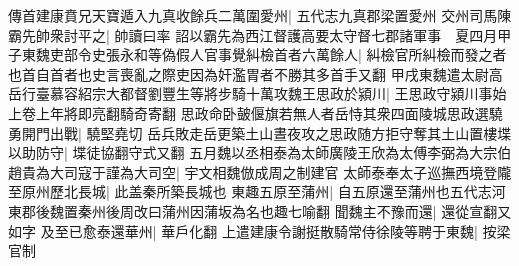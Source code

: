 傳首建康賁兄天寶遁入九真收餘兵二萬圍愛州|{
	五代志九真郡梁置愛州}
交州司馬陳霸先帥衆討平之|{
	帥讀曰率}
詔以霸先為西江督護高要太守督七郡諸軍事　夏四月甲子東魏吏部令史張永和等偽假人官事覺糾檢首者六萬餘人|{
	糾檢官所糾檢而發之者也首自首者也史言喪亂之際吏因為奸濫胃者不勝其多首手又翻}
甲戌東魏遣太尉高岳行臺慕容紹宗大都督劉豐生等將步騎十萬攻魏王思政於潁川|{
	王思政守潁川事始上卷上年將即亮翻騎奇寄翻}
思政命卧皷偃旗若無人者岳恃其衆四面陵城思政選驍勇開門出戰|{
	驍堅堯切}
岳兵敗走岳更築土山晝夜攻之思政随方拒守奪其土山置樓堞以助防守|{
	堞徒協翻守式又翻}
五月魏以丞相泰為太師廣陵王欣為太傅李弼為大宗伯趙貴為大司寇于謹為大司空|{
	宇文相魏倣成周之制建官}
太師泰奉太子巡撫西境登隴至原州歷北長城|{
	此盖秦所築長城也}
東趣五原至蒲州|{
	自五原還至蒲州也五代志河東郡後魏置秦州後周改曰蒲州因蒲坂為名也趣七喻翻}
聞魏主不豫而還|{
	還從宣翻又如字}
及至已愈泰還華州|{
	華戶化翻}
上遣建康令謝挺散騎常侍徐陵等聘于東魏|{
	按梁官制}


